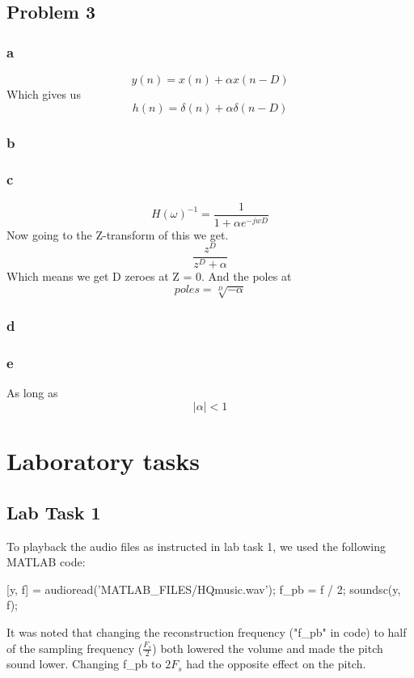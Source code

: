 \documentclass[a4paper,11pt]{article}
\begin{document}
\subsection{Problem 3}
\subsubsection{a}
\[
y(n) = x(n) + \alpha x(n-D)
\]
Which gives us
\[
h(n) = \delta(n) + \alpha\delta(n-D)
\]
\subsubsection{b}
\subsubsection{c}
\[
H(\omega)^{-1} = \frac{1}{1 + \alpha e^{-jwD}}
\]
Now going to the Z-transform of this we get.
\[
\frac{z^D}{z^D + \alpha}
\]
Which means we get D zeroes at Z = 0. And the poles at
\[
poles = \sqrt[D]{-\alpha}
\]
\subsubsection{d}
\subsubsection{e}
As long as 
\[
|\alpha| < 1
\]

\section{Laboratory tasks}

\subsection{Lab Task 1}
To playback the audio files as instructed in lab task 1, we used the following MATLAB code:
\begin{ffcode} 
[y, f] = audioread('MATLAB_FILES/HQmusic.wav');
f_pb = f / 2;
soundsc(y, f);
\end{ffcode}

It was noted that changing the reconstruction frequency ("f\_pb" in code) to half of the sampling frequency ($\frac{F_s}{2}$) both lowered the volume and made the pitch sound lower. Changing f\_pb to $2F_s$ had the opposite effect on the pitch.
\end{document}
